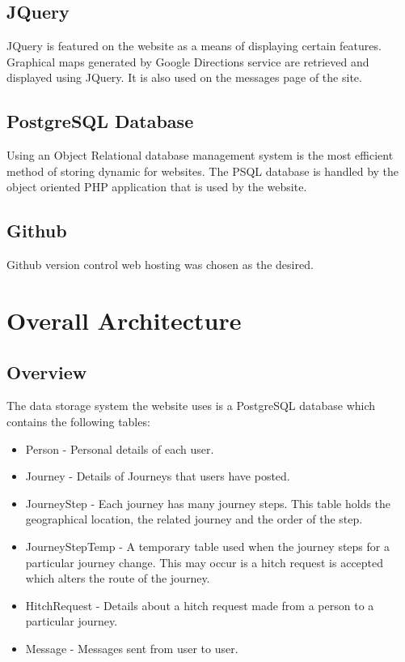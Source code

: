 	\subsection{JQuery}
		JQuery is featured on the website as a means of displaying certain features. Graphical maps generated by Google Directions \cite{google_directions_api} service are retrieved and displayed using JQuery. It is also used on the messages page of the site.	
			
	\subsection{PostgreSQL Database}
	Using an Object Relational database management system is the most efficient method of storing dynamic for websites. The PSQL database is handled by the object oriented PHP application that is used by the website.
	
	\subsection{Github}
		Github \cite{github} version control web hosting was chosen as the desired.
		 
\section{Overall Architecture}
	\subsection{Overview}	
		The data storage system the website uses is a PostgreSQL database which contains the following tables:
		\begin{itemize}
		\item Person - Personal details of each user.
		\item Journey - Details of Journeys that users have posted.
		\item Journey\textunderscore Step - Each journey has many journey steps. This table holds the geographical location, the related journey and the order of the step.
		\item Journey\textunderscore Step\textunderscore Temp - A temporary table used when the journey steps for a particular journey change. This may occur is a hitch request is accepted which alters the route of the journey.
		\item Hitch\textunderscore Request - Details about a hitch request made from a person to a particular journey.
		\item Message - Messages sent from user to user.
		\end{itemize}
		
